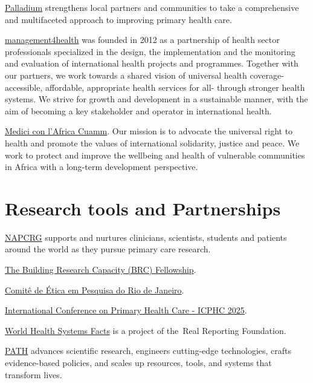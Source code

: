 \documentclass[
  letterpaper,
  DIV=11,
  numbers=noendperiod]{scrreprt}
\begin{document}
\href{https://thepalladiumgroup.com/areas-expertise/health}{Palladium}
strengthens local partners and communities to take a comprehensive and
multifaceted approach to improving primary health care.

\href{https://m4health.pro/about-us/}{management4health} was founded in
2012 as a partnership of health sector professionals specialized in the
design, the implementation and the monitoring and evaluation of
international health projects and programmes. Together with our
partners, we work towards a shared vision of universal health coverage-
accessible, affordable, appropriate health services for all- through
stronger health systems. We strive for growth and development in a
sustainable manner, with the aim of becoming a key stakeholder and
operator in international health.

\href{https://doctorswithafrica.org/}{Medici con l'Africa Cuamm}. Our
mission is to advocate the universal right to health and promote the
values of international solidarity, justice and peace. We work to
protect and improve the wellbeing and health of vulnerable communities
in Africa with a long-term development perspective.


\chapter{Research tools and
Partnerships}\label{research-tools-and-partnerships}

\href{https://www.napcrg.org/}{NAPCRG} supports and nurtures clinicians,
scientists, students and patients around the world as they pursue
primary care research.

\href{https://www.adfm.org/programs/brc-fellowship/}{The Building
Research Capacity (BRC) Fellowship}.

\href{https://saude.prefeitura.rio/comite-de-etica-em-pesquisa/}{Comitê
de Ética em Pesquisa do Rio de Janeiro}.

\href{https://icphc.iphce.org/}{International Conference on Primary
Health Care - ICPHC 2025}.

\href{https://healthsystemsfacts.org/?_gl=1\%2A1aq2uve\%2A_up\%2AMQ..\%2A_ga\%2AMTUxMzYxNjc4OS4xNzUwNDcxMTI2\%2A_ga_SDY74B5S30\%2AczE3NTA0NzExMjQkbzEkZzAkdDE3NTA0NzExMjQkajYwJGwwJGgw}{World
Health Systems Facts} is a project of the~Real Reporting Foundation.

\href{https://www.path.org/what-we-do/}{PATH} advances scientific
research, engineers cutting-edge technologies, crafts evidence-based
policies, and scales up resources, tools, and systems that transform
lives.
\end{document}
